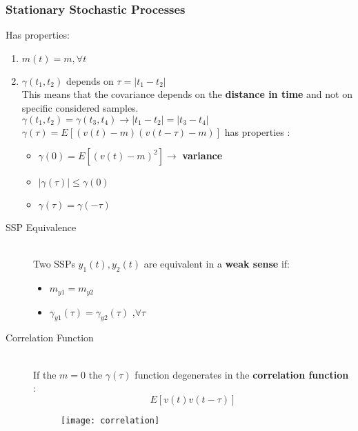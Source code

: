 \subsubsection{Stationary Stochastic Processes}
Has properties:
\begin{enumerate}
\item $ m(t) = m , \forall t$
\item $ \gamma(t_1,t_2) $ depends on $ \tau = | t_1 - t_2 | $ \\ This means that the covariance depends on the \textbf{distance in time} and not on specific considered samples.\\ 
   $ \gamma(t_1,t_2)= \gamma(t_3,t_4) \rightarrow |t_1-t_2|=|t_3-t_4|$ \\
   $ \gamma(\tau) = E[ (v(t) - m)(v(t-\tau)-m)] $ has properties :
   \begin{itemize}
   \item $ \gamma(0) = E[(v(t)-m)^2] \rightarrow$ \textbf{variance}
   \item $ |\gamma(\tau)| \leq \gamma(0) $
   \item $ \gamma(\tau) = \gamma(- \tau)$
   \end{itemize}
\end{enumerate}
\begin{description}
\item[SSP Equivalence]\hfill\\
Two SSPs $y_1(t) , y_2(t)$ are equivalent in a \textbf{weak sense} if:
\begin{itemize}
\item $m_{y1} = m_{y2}$
\item $\gamma_{y1}(\tau) = \gamma_{y2}(\tau)  $ ,$\forall \tau$
\end{itemize}
\newpage
\item[Correlation Function]\hfill\\
If the $ m = 0 $ the $ \gamma(\tau) $ function degenerates in the \textbf{correlation function} : $$ E[v(t)v(t-\tau)] $$
\begin{figure}[!h]
  \centering
  \texttt{[image: correlation]}
\end{figure}
\end{description}

